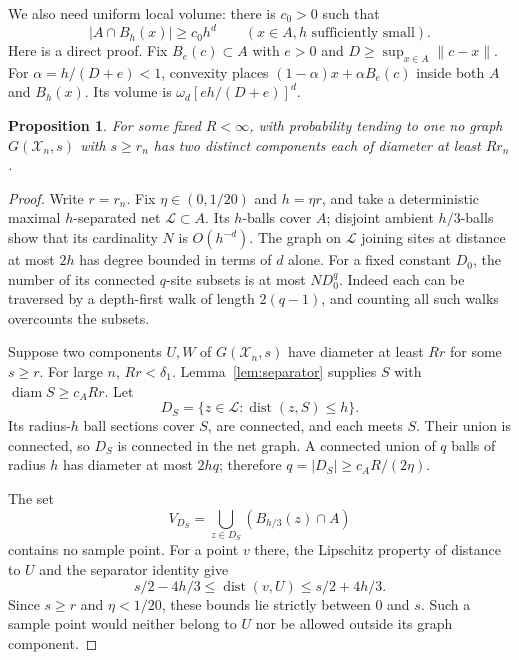 \documentclass[11pt]{article}
\newtheorem{proposition}[theorem]{Proposition}
\theoremstyle{remark}
\newcommand{\dist}{\operatorname{dist}}
\newcommand{\diam}{\operatorname{diam}}
\begin{document}
We also need uniform local volume: there is $c_0>0$ such that
\begin{equation}\label{eq:localmass}
 |A\cap B_h(x)|\geq c_0h^d\qquad(x\in A, h\text{ sufficiently small}).
\end{equation}
Here is a direct proof. Fix $B_e(c)\subset A$ with $e>0$ and
$D\geq\sup_{x\in A}\|c-x\|$. For $\alpha=h/(D+e)<1$, convexity places
$(1-\alpha)x+\alpha B_e(c)$ inside both $A$ and $B_h(x)$.
Its volume is $\omega_d[eh/(D+e)]^d$.

\begin{proposition}\label{prop:large}
For some fixed $R<\infty$, with probability tending to one no graph
$G(\mathcal X_n,s)$ with $s\geq r_n$ has two distinct components each of
diameter at least $Rr_n$.
\end{proposition}
\begin{proof}
Write $r=r_n$. Fix $\eta\in(0,1/20)$ and $h=\eta r$, and take a deterministic
maximal $h$-separated net $\mathcal L\subset A$.
Its $h$-balls cover $A$; disjoint ambient $h/3$-balls show that its cardinality
$N$ is $O(h^{-d})$. The graph on $\mathcal L$ joining sites at distance at
most $2h$ has degree bounded in terms of $d$ alone. For a fixed constant
$D_0$, the number of its connected $q$-site subsets is at most $ND_0^q$.
Indeed each can be traversed by a depth-first walk of length $2(q-1)$,
and counting all such walks overcounts the subsets.

Suppose two components $U,W$ of $G(\mathcal X_n,s)$ have diameter at least
$Rr$ for some $s\geq r$. For large $n$, $Rr<\delta_1$.
Lemma~\ref{lem:separator} supplies $S$ with $\diam S\geq c_ARr$.
Let
\[
 D_S=\{z\in\mathcal L:\dist(z,S)\leq h\}.
\]
Its radius-$h$ ball sections cover $S$, are connected, and each meets $S$.
Their union is connected, so $D_S$ is connected in the net graph.
A connected union of $q$ balls of radius $h$ has diameter at most $2hq$;
therefore $q=|D_S|\geq c_AR/(2\eta)$.

The set
\[
 V_{D_S}=\bigcup_{z\in D_S}(B_{h/3}(z)\cap A)
\]
contains no sample point. For a point $v$ there, the Lipschitz property of
distance to $U$ and the separator identity give
\[
 s/2-4h/3\leq\dist(v,U)\leq s/2+4h/3.
\]
Since $s\geq r$ and $\eta<1/20$, these bounds lie strictly between $0$ and
$s$. Such a sample point would neither belong to $U$ nor be allowed outside
its graph component.


\end{proof}
\end{document}
